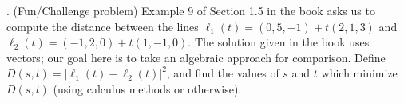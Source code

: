 \documentclass[11pt]{article}
\theoremstyle{definition}
\newcounter{prob}
\newcounter{subprob}
\newcommand\itm{\theprob.  \stepcounter{prob}\setcounter{subprob}{1}}
\newcommand\sol[2]{\iftoggle{solutions}{\textit{Solution}. #1}{#2}}
\renewcommand\vec[1]{\mathbf{#1}}
\begin{document}


\itm (Fun/Challenge problem) Example 9 of Section 1.5 in the book asks us to compute the distance between the lines $\ell_1(t) = (0,5,-1) + t(2,1,3)$ and $\ell_2(t)=(-1,2,0)+t(1,-1,0)$. The solution given in the book uses vectors; our goal here is to take an algebraic approach for comparison. Define $D(s,t)=|\ell_1(t)-\ell_2(t)|^2$, and find the values of $s$ and $t$ which minimize $D(s,t)$ (using calculus methods or otherwise). 

\sol{We have $D(s,t)=(2 t - (-1 + s))^2 + (5 + t - (2 - s))^2 + (-1 + 3 t)^2$, and if $D$ is minimized then $\partial D/\partial s=0$ and $\partial D/\partial t=0$. These two derivatives are $\partial D/\partial s = 4 + 4 s - 2 t$ and $\partial D/\partial t = 4 - 2 s + 28 t$. Setting each of these equal to 0 and solving the system, we find $s=-10/9$ and $t=-2/9$. Substituting into $D(s,t)$, we find that the minimal squared distance is 25/3. }{\vfill}
\end{document}
